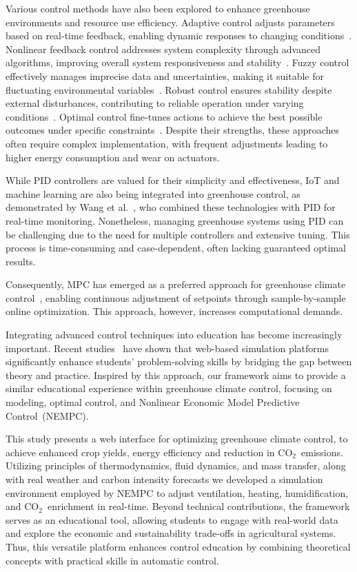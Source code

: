 \documentclass[conference]{IEEEtran}
\newcommand{\coo}{\ensuremath{\mathrm{CO_2}}}
\begin{document}
Various control methods have also been explored to enhance greenhouse environments and resource use efficiency. Adaptive control adjusts parameters based on real-time feedback, enabling dynamic responses to changing conditions~\cite{Tian2022}. Nonlinear feedback control addresses system complexity through advanced algorithms, improving overall system responsiveness and stability~\cite{Bood2023}. Fuzzy control effectively manages imprecise data and uncertainties, making it suitable for fluctuating environmental variables~\cite{smartcities7030055}. Robust control ensures stability despite external disturbances, contributing to reliable operation under varying conditions~\cite{Zhang2021}. Optimal control fine-tunes actions to achieve the best possible outcomes under specific constraints~\cite{Debroy2024, SVENSEN2024108578}. Despite their strengths, these approaches often require complex implementation, with frequent adjustments leading to higher energy consumption and wear on actuators.

While PID controllers are valued for their simplicity and effectiveness, IoT and machine learning are also being integrated into greenhouse control, as demonstrated by Wang et al.~\cite{Wang2024}, who combined these technologies with PID for real-time monitoring. Nonetheless, managing greenhouse systems using PID can be challenging due to the need for multiple controllers and extensive tuning. This process is time-consuming and case-dependent, often lacking guaranteed optimal results.

Consequently, MPC has emerged as a preferred approach for greenhouse climate control~\cite{Hu2022}, enabling continuous adjustment of setpoints through sample-by-sample online optimization. This approach, however, increases computational demands.

Integrating advanced control techniques into education has become increasingly important. Recent studies~\cite{WangEducation2024, Zakova2024} have shown that web-based simulation platforms significantly enhance students' problem-solving skills by bridging the gap between theory and practice. Inspired by this approach, our framework aims to provide a similar educational experience within greenhouse climate control, focusing on modeling, optimal control, and Nonlinear Economic Model Predictive Control~(NEMPC).

This study presents a web interface for optimizing greenhouse climate control, to achieve enhanced crop yields, energy efficiency and reduction in \coo\ emissions. Utilizing principles of thermodynamics, fluid dynamics, and mass transfer, along with real weather and carbon intensity forecasts we developed a simulation environment employed by NEMPC to adjust ventilation, heating, humidification, and \coo\ enrichment in real-time. Beyond technical contributions, the framework serves as an educational tool, allowing students to engage with real-world data and explore the economic and sustainability trade-offs in agricultural systems. Thus, this versatile platform enhances control education by combining theoretical concepts with practical skills in automatic control.
\end{document}
